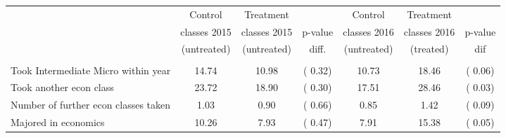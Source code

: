 \begin{tabular}{lcccccc} \toprule \toprule
& Control & Treatment & & Control & Treatment & \\
& classes 2015 & classes 2015& p-value & classes 2016 & classes 2016 & p-value \\
& (untreated) & (untreated) & diff. & (untreated) & (treated) & dif\\
\midrule \\
Took Intermediate Micro within year& 14.74& 10.98&(  0.32)& 10.73& 18.46&(  0.06) \\
Took another econ class& 23.72& 18.90&(  0.30)& 17.51& 28.46&(  0.03) \\
Number of further econ classes taken &  1.03&  0.90&(  0.66)&  0.85&  1.42&(  0.09) \\
Majored in economics & 10.26&  7.93&(  0.47)&  7.91& 15.38&(  0.05) \\
\bottomrule \bottomrule
\end{tabular}
